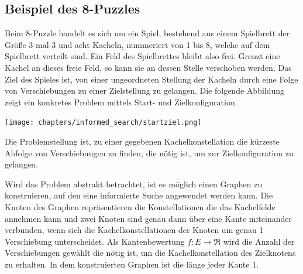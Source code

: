 \subsection{Beispiel des 8-Puzzles}
Beim 8-Puzzle handelt es sich um ein Spiel, bestehend aus einem Spielbrett der Gr\"o\ss e 3-mal-3 und acht Kacheln, nummeriert von 1 bis 8, welche auf dem Spielbrett verteilt sind. Ein Feld des Spielbrettes bleibt also frei. Grenzt eine Kachel an dieses freie Feld, so kann sie an dessen Stelle verschoben werden. Das Ziel des Spieles ist, von einer ungeordneten Stellung der Kacheln durch eine Folge von Verschiebungen zu einer Zielstellung zu gelangen. Die folgende Abbildung zeigt ein konkretes Problem mittels Start- und Zielkonfiguration.
\begin{center}\texttt{[image: chapters/informed\_search/startziel.png]}\end{center}
Die Problemstellung ist, zu einer gegebenen Kachelkonstellation die k\"urzeste Abfolge von Verschiebungen zu finden, die n\"otig ist, um zur Zielkonfiguration zu gelangen.

Wird das Problem abstrakt betrachtet, ist es m\"oglich einen Graphen zu konstruieren, auf den eine informierte Suche angewendet werden kann. Die Knoten des Graphen repr\"asentieren die Konstellationen die das Kachelfelde annehmen kann und zwei Knoten sind genau dann \"uber eine Kante miteinander verbunden, wenn sich die Kachelkonstellationen der Knoten um genau 1 Verschiebung unterscheidet. Als Kantenbewertung $f:E \rightarrow \Re$ wird die Anzahl der Verschiebungen gew\"ahlt die n\"otig ist, um die Kachelkonstellation des Zielknotens zu erhalten. In dem konstruierten Graphen ist die l\"ange jeder Kante 1.

